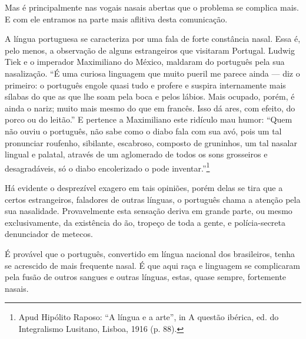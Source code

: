 Mas é principalmente nas vogais nasais abertas que o problema se
complica mais. E com ele entramos na parte mais aflitiva desta
comunicação.

A língua portuguesa se caracteriza por uma fala de forte constância
nasal. Essa é, pelo menos, a observação de alguns estrangeiros que
visitaram Portugal. Ludwig Tiek e o imperador Maximiliano do México,
maldaram do português pela sua nasalização. ``É uma curiosa linguagem
que muito pueril me parece ainda --- diz o primeiro: o português engole
quasi tudo e profere e suspira internamente mais sílabas do que as que
lhe soam pela boca e pelos lábios. Mais ocupado, porém, é ainda o nariz;
muito mais mesmo do que em francês. Isso dá ares, com efeito, do porco
ou do leitão.'' E pertence a Maximiliano este ridículo mau humor: ``Quem
não ouviu o português, não sabe como o diabo fala com sua avó, pois um
tal pronunciar roufenho, sibilante, escabroso, composto de gruninhos, um
tal nasalar lingual e palatal, através de um aglomerado de todos os sons
grosseiros e desagradáveis, só o diabo encolerizado o pode inventar.''\footnote{Apud Hipólito Raposo: ``A língua e a arte'', in A questão ibérica,
ed. do Integralismo Lusitano, Lisboa, 1916 (p. 88).}

Há evidente o desprezível exagero em tais opiniões, porém delas se tira
que a certos estrangeiros, faladores de outras línguas, o português
chama a atenção pela sua nasalidade. Provavelmente esta sensação deriva
em grande parte, ou mesmo exclusivamente, da existência do ão, tropeço
de toda a gente, e polícia-secreta denunciador de metecos.

É provável que o português, convertido em língua nacional dos
brasileiros, tenha se acrescido de mais frequente nasal. É que aqui raça
e linguagem se complicaram pela fusão de outros sangues e outras
línguas, estas, quase sempre, fortemente nasais.

